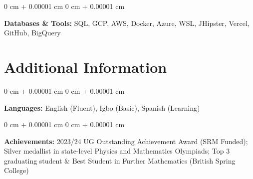 \documentclass[10pt, a4paper]{article}
\newenvironment{onecolentry}{
    \begin{adjustwidth}{
        0 cm + 0.00001 cm
    }{
        0 cm + 0.00001 cm
    }
}{
    \end{adjustwidth}
} %
\begin{document}
    \vspace{0.2 cm}

    \begin{onecolentry}
        \textbf{Databases \& Tools:} SQL, GCP, AWS, Docker, Azure, WSL, JHipster, Vercel, GitHub, BigQuery
    \end{onecolentry}

    \vspace{0.2 cm}

    \section{Additional Information}

    \begin{onecolentry}
        \textbf{Languages:} English (Fluent), Igbo (Basic), Spanish (Learning)
    \end{onecolentry}

    \vspace{0.1 cm}



    \begin{onecolentry}
        \textbf{Achievements:} 2023/24 UG Outstanding Achievement Award (SRM Funded); Silver medallist in state-level Physics and Mathematics Olympiads; Top 3 graduating student \& Best Student in Further Mathematics (British Spring College)
    \end{onecolentry}

    \vspace{0.2 cm}
\end{document}
